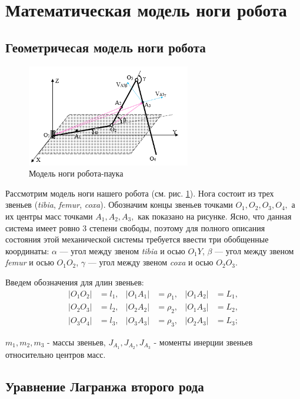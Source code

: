 \documentclass{article}
\begin{document}
\section{Математическая модель ноги робота}

\subsection{Геометричесая модель ноги робота}

\begin{figure}[h]
\centering
\includegraphics[height=12em]{images/leg_skhem.png}
\caption{Модель ноги робота-паука}
\label{fig:leg_model}
\end{figure}

Рассмотрим модель ноги нашего робота (см. рис. \ref{fig:leg_model}). Нога состоит из трех звеньев (\emph{tibia}, \emph{femur}, \emph{coxa}). Обозначим концы звеньев точками $O_1, O_2, O_3, O_4,$ а их центры масс точками $A_1, A_2, A_3, $ как показано на рисунке. Ясно, что данная система имеет ровно 3 степени свободы, поэтому для полного описания состояния этой механической системы требуется ввести три обобщенные координаты: $\alpha$ --- угол между звеном \emph{tibia} и осью $O_1Y$, $\beta$ --- угол между звеном \emph{femur} и осью $O_1O_2$, $\gamma$ --- угол между звеном \emph{coxa} и осью $O_2O_3$.

Введем обозначения для длин звеньев:
\begin{align*}
|O_1O_2| &= l_1, & |O_1A_1| &= \rho_1, & |O_1A_2| &= L_1,\\
|O_2O_3| &= l_2, & |O_2A_2| &= \rho_2, & |O_1A_3| &= L_2,\\
|O_3O_4| &= l_3, & |O_3A_3| &= \rho_3, & |O_2A_3| &= L_3;
\end{align*}

$m_1, m_2, m_3$ - массы звеньев, $J_{A_1}, J_{A_2},J_{A_3}$ - моменты инерции звеньев относительно центров масс.

\subsection{Уравнение Лагранжа второго рода}
\end{document}
